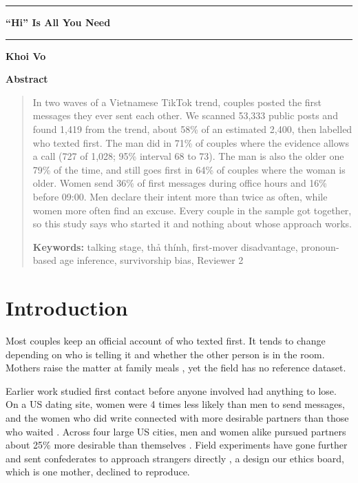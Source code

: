 \documentclass[10pt,letterpaper]{article}
\begin{document}
\noindent\rule{\textwidth}{4pt}\par\vspace{.16in}
\begin{center}{\fontsize{17}{20}\selectfont\bfseries ``Hi'' Is All You Need}\end{center}
\vspace{.04in}\noindent\rule{\textwidth}{1pt}\par\vspace{.2in}
\begin{center}\textbf{Khoi Vo}\end{center}
\vspace{.16in}
\begin{center}{\large\bfseries Abstract}\end{center}
\vspace{-.5em}\begin{quote}In two waves of a Vietnamese TikTok trend, couples posted the first messages they ever sent each other. We scanned 53,333 public posts and found 1,419 from the trend, about 58\% of an estimated 2,400, then labelled who texted first. The man did in 71\% of couples where the evidence allows a call (727 of 1,028; 95\% interval 68 to 73). The man is also the older one 79\% of the time, and still goes first in 64\% of couples where the woman is older. Women send 36\% of first messages during office hours and 16\% before 09:00. Men declare their intent more than twice as often, while women more often find an excuse. Every couple in the sample got together, so this study says who started it and nothing about whose approach works.

\textbf{Keywords:} talking stage, thả thính, first-mover disadvantage, pronoun-based age inference, survivorship bias, Reviewer 2\end{quote}
\section{Introduction}
Most couples keep an official account of who texted first. It tends to change depending on who is telling it and whether the other person is in the room. Mothers raise the matter at family meals \cite{me}, yet the field has no reference dataset.

Earlier work studied first contact before anyone involved had anything to lose. On a US dating site, women were 4 times less likely than men to send messages, and the women who did write connected with more desirable partners than those who waited \cite{kreager}. Across four large US cities, men and women alike pursued partners about 25\% more desirable than themselves \cite{bruch}. Field experiments have gone further and sent confederates to approach strangers directly \cite{clark}, a design our ethics board, which is one mother, declined to reproduce.
\end{document}
